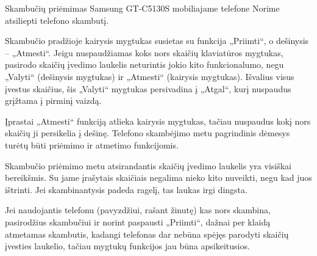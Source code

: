 \begin{xcase}{Skambučių priėmimas Samsung GT-C5130S mobiliajame telefone}
  \xcgoal
  {
    Norime atsiliepti telefono skambutį.
  }
  
  \xctools
  { %
  }
  
  \xcresult
  {
    Skambučio pradžioje kairysis mygtukas susietas su funkcija „Priimti“, o
    dešinysis – „Atmesti“. Jeigu nuspaudžiamas koks nors skaičių klaviatūros
    mygtukas, pasirodo skaičių įvedimo laukelis neturintis jokio kito
    funkcionalumo, negu „Valyti“ (dešinysis mygtukas) ir „Atmesti“ (kairysis
    mygtukas). Išvalius visus įvestus skaičius, šis „Valyti“ mygtukas
    persivadina į „Atgal“, kurį nuspaudus grįžtama į pirminį vaizdą.
  }
  
  \xcprinciples
  {
    {
      Įprastai „Atmesti“ funkciją atlieka kairysis mygtukas, tačiau
      nuspaudus kokį nors skaičių ji persikelia į dešinę. Telefono
      skambėjimo metu pagrindinis dėmesys turėtų būti priėmimo ir atmetimo
      funkcijomis.
    }
  }
  
  \xcthoughts
  {
    Skambučio priėmimo metu atsirandantis skaičių įvedimo laukelis yra
    visiškai bereikšmis. Su jame įrašytais skaičiais negalima nieko kito
    nuveikti, negu kad juos ištrinti. Jei skambinantysis padeda ragelį,
    tas laukas irgi dingsta.

    Jei naudojantis telefonu (pavyzdžiui, rašant žinutę) kas nors skambina,
    pasirodžius skambučiui ir norint paspausti „Priimti“, dažnai per klaidą
    atmetamas skambutis, kadangi telefonas dar nebūna spėjęs parodyti
    skaičių įvesties laukelio, tačiau mygtukų funkcijos jau būna
    apsikeitusios.
  }
\end{xcase}
